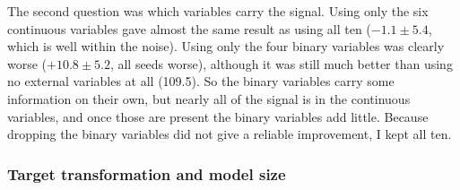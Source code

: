 \documentclass[a4, 12pt]{article}
\begin{document}
The second question was which variables carry the signal. Using only the six continuous variables gave almost the same result as using all ten ($-1.1 \pm 5.4$, which is well within the noise). Using only the four binary variables was clearly worse ($+10.8 \pm 5.2$, all seeds worse), although it was still much better than using no external variables at all (109.5). So the binary variables carry some information on their own, but nearly all of the signal is in the continuous variables, and once those are present the binary variables add little. Because dropping the binary variables did not give a reliable improvement, I kept all ten.

\begin{table}[h]
\centering
\caption{Design experiments without engineered features (second session). $\Delta$RMSE is the seed-by-seed difference to the reference. ``Windows better'' is the fraction of the 50 validation windows in which the variant has the lower error.}
\label{tab:design}
\small
{}
\end{table}

\subsubsection{Target transformation and model size}
\label{sec:target}
\end{document}
